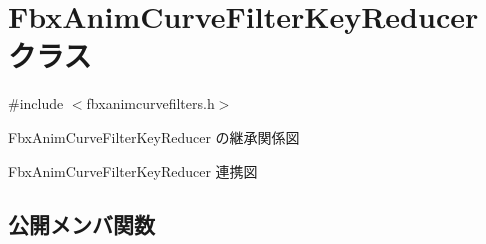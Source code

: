 \hypertarget{class_fbx_anim_curve_filter_key_reducer}{}\section{Fbx\+Anim\+Curve\+Filter\+Key\+Reducer クラス}
\label{class_fbx_anim_curve_filter_key_reducer}


{\ttfamily \#include $<$fbxanimcurvefilters.\+h$>$}



Fbx\+Anim\+Curve\+Filter\+Key\+Reducer の継承関係図


Fbx\+Anim\+Curve\+Filter\+Key\+Reducer 連携図
\subsection*{公開メンバ関数}

